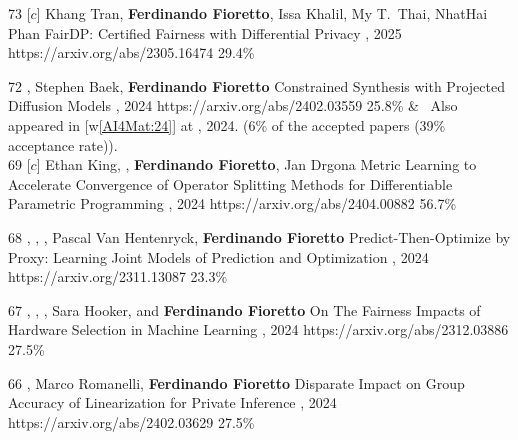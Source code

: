 \begin{pubs}
\confentry
	{73}
	{[$c$] Khang Tran, {\bf Ferdinando Fioretto}, Issa Khalil, My T.~Thai, NhatHai Phan}
	{FairDP: Certified Fairness with Differential Privacy}
	{, 2025}
	{https://arxiv.org/abs/2305.16474}
	{29.4\%}%


\confentry
	{72}
	{, Stephen Baek, {\bf Ferdinando Fioretto}}
  	{Constrained Synthesis with Projected Diffusion Models}
  	{\procNeurIPS, 2024}
	{https://arxiv.org/abs/2402.03559}
	{25.8\%}
&	\hspace{4pt} \faAngleRight\, Also appeared in [w\ref{AI4Mat:24}] at , 2024. 
	\hspace{4pt} \textcolor{purple}{\faTrophy {\bf [Oral]}} (6\% of the accepted papers (39\% acceptance rate)).\\[0.5em]

\confentry
	{69}
	{[$c$] Ethan King, , {\bf Ferdinando Fioretto}, Jan Drgona}
	{Metric Learning to Accelerate Convergence of Operator Splitting Methods for Differentiable Parametric Programming}
	{, 2024}
	{https://arxiv.org/abs/2404.00882}
	{56.7\%}

\confentry
	{68}
	{, , , Pascal Van Hentenryck, {\bf Ferdinando Fioretto}}
	{Predict-Then-Optimize by Proxy: Learning Joint Models of Prediction and Optimization}
  	{\procECAI, 2024}
  	{https://arxiv.org/2311.13087}
  	{23.3\%} %

\confentry
	{67}
	{, , , Sara Hooker, and {\bf Ferdinando Fioretto}}
	{On The Fairness Impacts of Hardware Selection in Machine Learning}	
	{\procICML, 2024}
	{https://arxiv.org/abs/2312.03886}
	{27.5\%}

\confentry
	{66}
	{, Marco Romanelli, {\bf Ferdinando Fioretto}}
	{Disparate Impact on Group Accuracy of Linearization for Private Inference}
	{\procICML, 2024}
	{https://arxiv.org/abs/2402.03629}
	{27.5\%}


\end{pubs}
